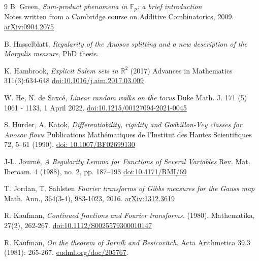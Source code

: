 \documentclass[a4paper]{article}
\theoremstyle{definition}
\begin{document}
\begin{thebibliography}{9}
    {B. Green}, 
    \emph{Sum-product phenomena in $\mathbb{F}_p$: a brief introduction} \\
    Notes written from a Cambridge course on Additive Combinatorics, 2009.  \href{https://arxiv.org/pdf/0904.2075.pdf}{arXiv:0904.2075}



    {B. Hasselblatt},
    \emph{Regularity of the Anosov splitting and a new description of the Margulis measure},
    PhD thesis.

    {K. Hambrook},
    \emph{Explicit Salem sets in $\mathbb{R}^2$}
    (2017) Advances in Mathematics 311(3):634-648
    \href{https://doi.org/10.1016/j.aim.2017.03.009}{doi:10.1016/j.aim.2017.03.009}


    {W. He, N. de Saxcé},
    \emph{Linear random walks on the torus}
    Duke Math. J. 171 (5) 1061 - 1133, 1 April 2022. \href{https://doi.org/10.1215/00127094-2021-0045}{doi:10.1215/00127094-2021-0045}

    {S. Hurder, A. Katok},
    \emph{Differentiability, rigidity and Godbillon-Vey classes for Anosov flows}
    Publications Mathématiques de l’Institut des Hautes Scientifiques 72, 5–61 (1990). \href{https://doi.org/10.1007/BF02699130}{doi: 10.1007/BF02699130}

    {J-L. Journé}, 
    \emph{A Regularity Lemma for Functions of Several Variables} 
    Rev. Mat. Iberoam. 4 (1988), no. 2, pp. 187–193 \href{https://doi.org/10.4171/rmi/69}{doi:10.4171/RMI/69}

    {T. Jordan, T. Sahlsten}
    \emph{ Fourier transforms of Gibbs measures for the Gauss map } \\
    Math. Ann., 364(3-4), 983-1023, 2016. 
    \href{ https://arxiv.org/abs/1312.3619 }{arXiv:1312.3619}


    {R. Kaufman},
    \emph{ Continued fractions and Fourier transforms.}
    (1980). Mathematika, 27(2), 262-267. \href{https://www.cambridge.org/core/journals/mathematika/article/abs/continued-fractions-and-fourier-transforms/2BF3B8A3312D7A5BD4CF7B3CC12C7C37}{doi:10.1112/S0025579300010147}


    {R. Kaufman},
    \emph{On the theorem of Jarník and Besicovitch.}
    Acta Arithmetica 39.3 (1981): 265-267. \href{http://eudml.org/doc/205767}{eudml.org/doc/205767}.




\end{thebibliography}
\end{document}
